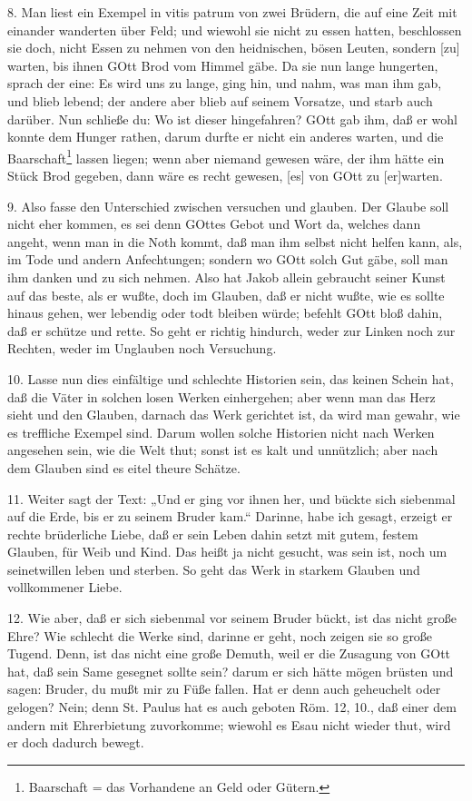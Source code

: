 8. Man liest ein Exempel in vitis patrum von zwei Brüdern, die auf eine Zeit mit einander wanderten über Feld; und wiewohl sie nicht zu essen hatten, beschlossen sie doch, nicht Essen zu nehmen von den heidnischen, bösen Leuten, sondern [zu] warten, bis ihnen GOtt Brod vom Himmel gäbe. Da sie nun lange hungerten, sprach der eine: Es wird uns zu lange, ging hin, und nahm, was man ihm gab, und blieb lebend; der andere aber blieb auf seinem Vorsatze, und starb auch darüber. Nun schließe du: Wo ist dieser hingefahren? GOtt gab ihm, daß er wohl konnte dem Hunger rathen, darum durfte er nicht ein anderes warten, und die Baarschaft\footnote{Baarschaft = das Vorhandene an Geld oder Gütern.} lassen liegen; wenn aber niemand gewesen wäre, der ihm hätte ein Stück Brod gegeben, dann wäre es recht gewesen, [es] von GOtt zu [er]warten.

9. Also fasse den Unterschied zwischen versuchen und glauben. Der Glaube soll nicht eher kommen, es sei denn GOttes Gebot und Wort da, welches dann angeht, wenn man in die Noth kommt, daß man ihm selbst nicht helfen kann, als, im Tode und andern Anfechtungen; sondern wo GOtt solch Gut gäbe, soll man ihm danken und zu sich nehmen. Also hat Jakob allein gebraucht seiner Kunst auf das beste, als er wußte, doch im Glauben, daß er nicht wußte, wie es sollte hinaus gehen, wer lebendig oder todt bleiben würde; befehlt GOtt bloß dahin, daß er schütze und rette. So geht er richtig hindurch, weder zur Linken noch zur Rechten, weder im Unglauben noch Versuchung.

10. Lasse nun dies einfältige und schlechte Historien sein, das keinen Schein hat, daß die Väter in solchen losen Werken einhergehen; aber wenn man das Herz sieht und den Glauben, darnach das Werk gerichtet ist, da wird man gewahr, wie es treffliche Exempel sind. Darum wollen solche Historien nicht nach Werken angesehen sein, wie die Welt thut; sonst ist es kalt und unnützlich; aber nach dem Glauben sind es eitel theure Schätze.

11. Weiter sagt der Text: „Und er ging vor ihnen her, und bückte sich siebenmal auf die Erde, bis er zu seinem Bruder kam.“ Darinne, habe ich gesagt, erzeigt er rechte brüderliche Liebe, daß er sein Leben dahin setzt mit gutem, festem Glauben, für Weib und Kind. Das heißt ja nicht gesucht, was sein ist, noch um seinetwillen leben und sterben. So geht das Werk in starkem Glauben und vollkommener Liebe.

12. Wie aber, daß er sich siebenmal vor seinem Bruder bückt, ist das nicht große Ehre? Wie schlecht die Werke sind, darinne er geht, noch zeigen sie so große Tugend. Denn, ist das nicht eine große Demuth, weil er die Zusagung von GOtt hat, daß sein Same gesegnet sollte sein? darum er sich hätte mögen brüsten und sagen: Bruder, du mußt mir zu Füße fallen. Hat er denn auch geheuchelt oder gelogen? Nein; denn St. Paulus hat es auch geboten Röm. 12, 10., daß einer dem andern mit Ehrerbietung zuvorkomme; wiewohl es Esau nicht wieder thut, wird er doch dadurch bewegt.


